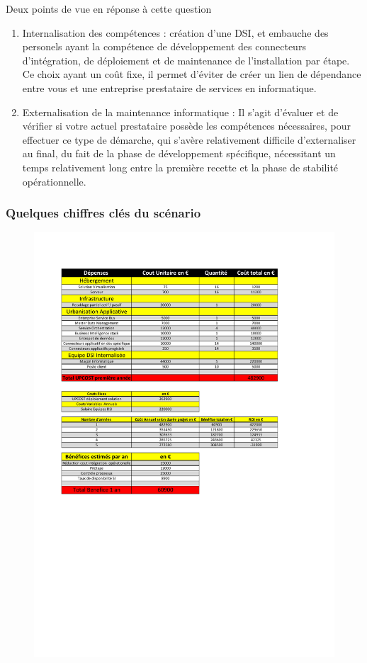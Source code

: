 Deux points de vue en réponse à cette question\\
\begin{enumerate}
\item Internalisation des compétences : création d'une DSI, et embauche des personels ayant la compétence de développement des connecteurs d'intégration, de déploiement et de maintenance de l'installation par étape. Ce choix ayant un coût fixe, il permet d'éviter de créer un lien de dépendance entre vous et une entreprise prestataire de services en informatique.
\item Externalisation de la maintenance informatique : Il s'agit d'évaluer et de vérifier si votre actuel prestataire possède les compétences nécessaires, pour effectuer ce type de démarche, qui s'avère relativement difficile d'externaliser au final, du fait de la phase de développement spécifique, nécessitant un temps relativement long entre la première recette et la phase de stabilité opérationnelle.
\end{enumerate}

\subsubsection{Quelques chiffres clés du scénario}
\begin{figure}[H]
\begin{center}
 \includegraphics [scale=0.5]{ChiffresScenario1.pdf}
\end{center}  
\end{figure}

